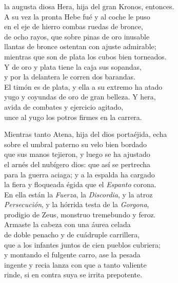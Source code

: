 la augusta diosa Hera, hija del gran Kronos, entonces.\\
A su vez la pronta Hebe fué y al coche le puso\\
en el eje de hierro combas ruedas de bronce,\\
de ocho rayos, que sobre pinas de oro inusable\\
llantas de bronce ostentan con ajuste admirable;\\
mientras que son de plata los cubos bien torneados.\\
Y de oro y plata tiene la caja sus sopandas,\\
y por la delantera le corren dos barandas.\\
El timón es de plata, y ella a su extremo ha atado\\
yugo y coyundas de oro de gran belleza. Y hera,\\
avida de combates y ejercicio agitado,\\
unce al yugo los potros firmes en la carrera.\par
Mientras tanto Atena, hija del dios portaéjida, echa\\
sobre el umbral paterno su velo bien bordado\\
que sus manos tejieron, y luego se ha ajustado\\
el arnés del nubígero dios: que así se pertrecha\\
para la guerra aciaga; y a la espalda ha cargado\\
la fiera y floqueada égida que el \emph{Espanto} corona.\\
En ella están la \emph{Fuerza}, la \emph{Discordia}, y la atroz\\
\emph{Persecución}, y la hórrida testa de la \emph{Gorgona},\\
prodigio de Zeus, monstruo tremebundo y feroz.\\
Armaste la cabeza con una áurea celada\\
de doble penacho y de cuádruple carrillera,\\
que a los infantes juntos de cien pueblos cubriera;\\
y montando el fulgente carro, ase la pesada\\
ingente y recia lanza con que a tanto valiente\\
rinde, si en contra suya se irrita prepotente.\par
\pend
\separator
\endnumbering